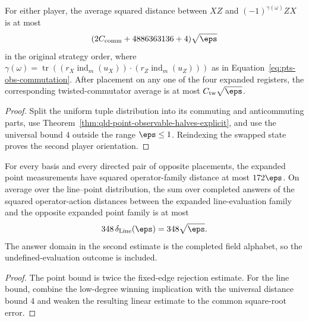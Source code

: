 \begin{theorem}
\label{thm:qld-twisted-commutation-explicit}
\leanok
{}
For either player, the average squared distance between $XZ$ and
$(-1)^{\gamma(\omega)}ZX$ is at most
\[
 (2C_{\mathrm{comm}}+4886363136+4)\sqrt\eps
\]
in the original strategy order, where
$\gamma(\omega)=\operatorname{tr}((r_X\operatorname{ind}_m(u_X))
\cdot(r_Z\operatorname{ind}_m(u_Z)))$ as in
Equation~\eqref{eq:pts-obs-commutation}.  After placement on any one of the
four expanded registers, the corresponding twisted-commutator average is at
most $C_{\mathrm{tw}}\sqrt\eps$.
\end{theorem}
\begin{proof}
\leanok
Split the uniform tuple distribution into its commuting and anticommuting
parts, use Theorem~\ref{thm:qld-point-observable-halves-explicit}, and use the
universal bound $4$ outside the range $\eps\leq1$.  Reindexing the swapped
state proves the second player orientation.
\end{proof}

\begin{theorem}
\label{thm:qld-expanded-comparisons-explicit}
\leanok
{}
For every basis and every directed pair of opposite placements, the expanded
point measurements have squared operator-family distance at most $172\eps$.
On average over the line--point distribution, the sum over completed answers
of the squared operator-action distances between the expanded line-evaluation
family and the opposite expanded point family is at most
\[
 348\,\delta_{\mathrm{Line}}(\eps)=348\sqrt\eps.
\]
The answer domain in the second estimate is the completed field alphabet, so
the undefined-evaluation outcome is included.
\end{theorem}
\begin{proof}
\leanok
The point bound is twice the fixed-edge rejection estimate.  For the line
bound, combine the low-degree winning implication with the universal distance
bound $4$ and weaken the resulting linear estimate to the common square-root
error.
\end{proof}
